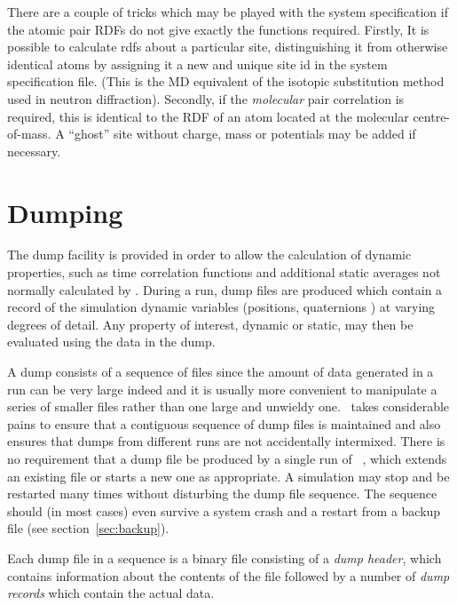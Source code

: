 There are a couple of tricks which may be played with the system
specification if the atomic pair RDFs do not give exactly the
functions required.  Firstly, It is possible to calculate rdfs about a
particular site, distinguishing it from otherwise identical atoms by
assigning it a new and unique site id in the system specification
file.  (This is the MD equivalent of the isotopic substitution method
used in neutron diffraction). Secondly, if the {\em molecular\/} pair
correlation is required, this is identical to the RDF of an atom
located at the molecular centre-of-mass.  A ``ghost'' site without
charge, mass or potentials may be added if necessary.
\pagebreak[3]
\section{Dumping}%
\label{sec:dumping}
The dump facility is provided in order to allow the calculation of
dynamic properties, such as time correlation functions and additional
static averages not normally calculated by \moldy.  During a run, dump
files are produced which contain a record of the simulation dynamic
variables (positions, quaternions \etc) at varying degrees of
detail.  Any property of interest, dynamic or static, may then be
evaluated using the data in the dump.

A dump consists of a sequence of files since the amount of data
generated in a run can be very large indeed and it is usually more
convenient to manipulate a series of smaller files rather than one
large and unwieldy one. \moldy\  takes considerable pains to ensure that
a contiguous sequence of dump files is maintained and also ensures
that dumps from different runs are not accidentally intermixed.  There
is no requirement that a dump file be produced by a single run of
\moldy\ , which extends an existing file or starts a new one as appropriate.
A simulation may stop and be restarted many times without
disturbing the dump file sequence.  The  sequence
should (in most cases) even survive a system crash and a restart from
a backup file (see section~\ref{sec:backup}).

Each dump file in a sequence is a binary file consisting of a {\em
dump header}, which contains information about the contents of the
file followed by a number of {\em dump records\/} which contain the
actual data.  

